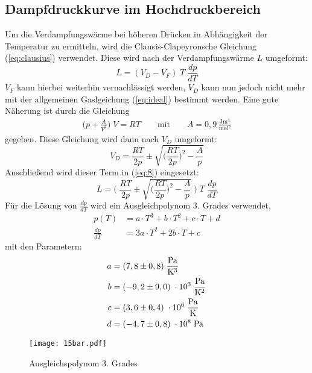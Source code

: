 \subsection{Dampfdruckkurve im Hochdruckbereich}
Um die Verdampfungswärme bei höheren Drücken in Abhängigkeit der Temperatur zu
ermitteln, wird die Clausis-Clapeyronsche Gleichung (\ref{eq:clausius}) verwendet.
Diese wird nach der Verdampfungswärme $L$ umgeformt:
\begin{equation}
  L = (V_D - V_F) \;T\; \frac{dp}{dT} \label{eq:8}
\end{equation}
$V_F$ kann hierbei weiterhin vernachlässigt werden, $V_D$ kann nun jedoch nicht mehr
mit der allgemeinen Gaslgeichung (\ref{eq:ideal}) bestimmt werden.
Eine gute Näherung ist durch die Gleichung
\begin{align}
  \biggr(p + \frac{A}{V^2}\biggl) \; V = RT \qquad \text{mit} \qquad A = 0,9 \,\frac{\si{\joule \meter^3}}
  {\si{\mol^2}}
\end{align}
gegeben.
Diese Gleichung wird dann nach $V_D$ umgeformt:
\begin{equation}
  V_D = \frac{RT}{2p} \pm \sqrt{\biggr(\frac{RT}{2p}\biggl)^2-\frac{A}{p}}
\end{equation}
Anschließend wird dieser Term in (\ref{eq:8}) eingesetzt:
\begin{equation}
  L = \Biggr(\; \frac{RT}{2p} \pm \sqrt{\biggr(\frac{RT}{2p}\biggl)^2-\frac{A}{p}} \; \Biggl)
  \; T \; \frac{dp}{dT}
\end{equation}
Für die Lösung von $\frac{dp}{dT}$ wird ein Ausgleichpolynom 3. Grades verwendet,
\begin{align}
  p(T) &= a \cdot T^3 + b \cdot T^2 + c \cdot T + d  \label{eq:pt}\\
  \frac{dp}{dT} &= 3a \cdot T^2 + 2b \cdot T +  c  \label{eq:dp}
\end{align}
mit den Parametern:
\begin{align*}
  a &= (7,8 \pm 0,8) \; \si{\frac{\pascal}{\kelvin^3}} \\
  b &= (-9,2 \pm 9,0) \; \cdot 10^3 \; \si{\frac{\pascal}{\kelvin^2}} \\
  c &= (3,6 \pm 0,4) \; \cdot 10^6 \; \si{\frac{\pascal}{\kelvin}} \\
  d &= (-4,7 \pm 0,8)\; \cdot 10^8 \; \si{\pascal}
\end{align*}


\begin{figure}[H] %
  \centering
  \texttt{[image: 15bar.pdf]}
  \caption{Ausgleichspolynom 3. Grades}
  \label{fig:15}
\end{figure}

